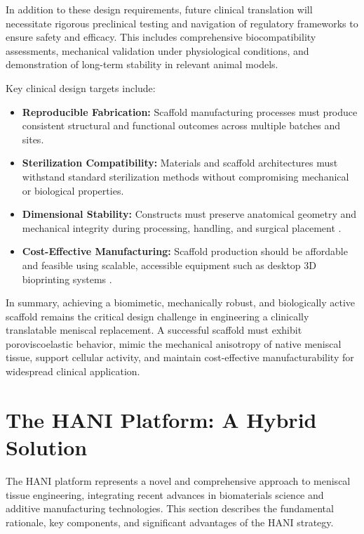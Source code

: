 In addition to these design requirements, future clinical translation will necessitate rigorous preclinical testing and navigation of regulatory frameworks to ensure safety and efficacy.
This includes comprehensive biocompatibility assessments, mechanical validation under physiological conditions, and demonstration of long-term stability in relevant animal models.

Key clinical design targets include:

\begin{itemize}
    \item \textbf{Reproducible Fabrication:} Scaffold manufacturing processes must produce consistent structural and functional outcomes across multiple batches and sites.
    
    \item \textbf{Sterilization Compatibility:} Materials and scaffold architectures must withstand standard sterilization methods without compromising mechanical or biological properties.
    
    \item \textbf{Dimensional Stability:} Constructs must preserve anatomical geometry and mechanical integrity during processing, handling, and surgical placement \cite{makris2011kneemeniscus}.
    
    \item \textbf{Cost-Effective Manufacturing:} Scaffold production should be affordable and feasible using scalable, accessible equipment such as desktop 3D bioprinting systems \cite{bahcecioglu20193dprinted,klarmann20233dprinting,elkommos2025hybridhydrogels}.
\end{itemize}

In summary, achieving a biomimetic, mechanically robust, and biologically active scaffold remains the critical design challenge in engineering a clinically translatable meniscal replacement.
A successful scaffold must exhibit poroviscoelastic behavior, mimic the mechanical anisotropy of native meniscal tissue, support cellular activity, and maintain cost-effective manufacturability for widespread clinical application.

\newpage
\section{The HANI Platform: A Hybrid Solution}

The HANI platform represents a novel and comprehensive approach to meniscal tissue engineering, integrating recent advances in biomaterials science and additive manufacturing technologies. This section describes the fundamental rationale, key components, and significant advantages of the HANI strategy.

